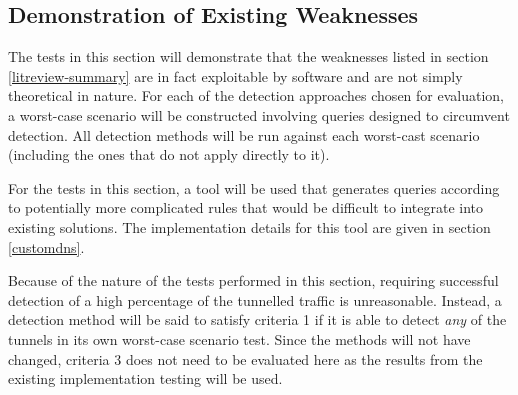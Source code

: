 \documentclass[12pt]{report}
\theoremstyle{remark}
\theoremstyle{definition}
\theoremstyle{definition}
\theoremstyle{definition}
\begin{document}
\subsection{Demonstration of Existing Weaknesses} \label{weaknesstest} The tests
in this section will demonstrate that the weaknesses listed in section
\ref{litreview-summary} are in fact exploitable by software and are not simply
theoretical in nature. For each of the detection approaches chosen for
evaluation, a worst-case scenario will be constructed involving queries designed
to circumvent detection. All detection methods will be run against each
worst-cast scenario (including the ones that do not apply directly to it).

For the tests in this section, a tool will be used that generates queries
according to potentially more complicated rules that would be difficult to
integrate into existing solutions. The implementation details for this tool are
given in section \ref{customdns}.

Because of the nature of the tests performed in this section, requiring
successful detection of a high percentage of the tunnelled traffic is
unreasonable. Instead, a detection method will be said to satisfy criteria 1 if
it is able to detect \emph{any} of the tunnels in its own worst-case scenario
test. Since the methods will not have changed, criteria 3 does not need to be
evaluated here as the results from the existing implementation testing will be
used.



\end{document}
